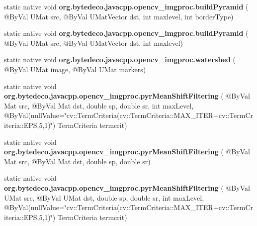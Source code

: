 \begin{DoxyCompactItemize}
\mbox{\label{group__imgproc__filter_gaec3a86fcf530d0110b9dcde9e37c73e3}} 
static native void {\bfseries org.\+bytedeco.\+javacpp.\+opencv\+\_\+imgproc.\+build\+Pyramid} ( @By\+Val U\+Mat src, @By\+Val U\+Mat\+Vector dst, int maxlevel, int border\+Type)
\item 
\mbox{\label{group__imgproc__filter_gaa018e0328589d5ad75d8cd2cd1a85e8d}} 
static native void {\bfseries org.\+bytedeco.\+javacpp.\+opencv\+\_\+imgproc.\+build\+Pyramid} ( @By\+Val U\+Mat src, @By\+Val U\+Mat\+Vector dst, int maxlevel)
\item 
\mbox{\label{group__imgproc__filter_ga74042529e3a3ecd92e161e5b62548ed5}} 
static native void {\bfseries org.\+bytedeco.\+javacpp.\+opencv\+\_\+imgproc.\+watershed} ( @By\+Val U\+Mat image, @By\+Val U\+Mat markers)
\item 
\mbox{\label{group__imgproc__filter_gac432ef4564feb8b2e1a2deac4db12913}} 
static native void {\bfseries org.\+bytedeco.\+javacpp.\+opencv\+\_\+imgproc.\+pyr\+Mean\+Shift\+Filtering} ( @By\+Val Mat src, @By\+Val Mat dst, double sp, double sr, int max\+Level, @By\+Val(null\+Value=\char`\"{}cv\+::\+Term\+Criteria(cv\+::\+Term\+Criteria\+::\+M\+A\+X\+\_\+\+I\+T\+ER+cv\+::\+Term\+Criteria\+::\+E\+PS,5,1)\char`\"{}) Term\+Criteria termcrit)
\item 
\mbox{\label{group__imgproc__filter_gade4d4ba80ee1a0a3ac366425edf6b911}} 
static native void {\bfseries org.\+bytedeco.\+javacpp.\+opencv\+\_\+imgproc.\+pyr\+Mean\+Shift\+Filtering} ( @By\+Val Mat src, @By\+Val Mat dst, double sp, double sr)
\item 
\mbox{\label{group__imgproc__filter_ga154238333e747daf891663cdb33d1a33}} 
static native void {\bfseries org.\+bytedeco.\+javacpp.\+opencv\+\_\+imgproc.\+pyr\+Mean\+Shift\+Filtering} ( @By\+Val U\+Mat src, @By\+Val U\+Mat dst, double sp, double sr, int max\+Level, @By\+Val(null\+Value=\char`\"{}cv\+::\+Term\+Criteria(cv\+::\+Term\+Criteria\+::\+M\+A\+X\+\_\+\+I\+T\+ER+cv\+::\+Term\+Criteria\+::\+E\+PS,5,1)\char`\"{}) Term\+Criteria termcrit)
\item 
\mbox{\label{group__imgproc__filter_ga8e24348e55b95d864865d7c1903e7555}} 

\end{DoxyCompactItemize}
